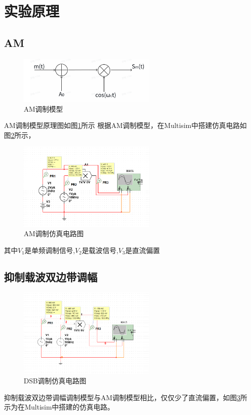 \documentclass[UTF8]{ctexart}
\begin{document}
\section{实验原理}
\subsection{AM}
\begin{figure}[htbp]
    \centering
    \includegraphics[width=0.6\textwidth]{1.png}
    \caption{AM调制模型}
    \label{img:1}
\end{figure}
AM调制模型原理图如图\ref{img:1}所示
根据AM调制模型，在Multisim中搭建仿真电路如图\ref{img:2}所示，
\begin{figure}[htbp]
    \centering
    \includegraphics[width=0.6\textwidth]{2.png}
    \caption{AM调制仿真电路图}
    \label{img:2}
\end{figure}
其中$V_1$是单频调制信号,$V_2$是载波信号,$V_3$是直流偏置
\subsection{抑制载波双边带调幅}
\begin{figure}[htbp]
    \centering
    \includegraphics[width=0.6\textwidth]{3.png}
    \caption{DSB调制仿真电路图}
    \label{img:3}
\end{figure}
抑制载波双边带调幅调制模型与AM调制模型相比，仅仅少了直流偏置，如图\ref{img:3}所示为在Multisim中搭建的仿真电路。
\end{document}
